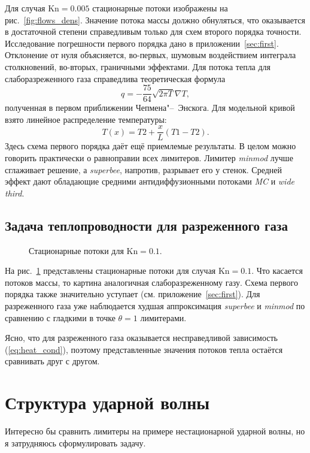 \documentclass[a4paper,10pt]{article}
\newcommand{\Kn}{\mathrm{Kn}}
\begin{document}
Для случая \(\Kn=0.005\) стационарные потоки изображены на рис.~\ref{fig:flows_dens}.
Значение потока массы должно обнуляться, что оказывается в достаточной степени справедливым только для схем второго порядка точности.
Исследование погрешности первого порядка дано в приложении~\ref{sec:first}. 
Отклонение от нуля объясняется, во-первых, шумовым воздействием интеграла столкновений, во-вторых, граничными эффектами.
Для потока тепла для слаборазреженного газа справедлива теоретическая формула
\begin{equation}
 q=-\frac{75}{64}\sqrt{2\pi T}\nabla T,
\label{eq:heat_cond}
\end{equation}
полученная в первом приближении Чепмена"--~Энскога.
Для модельной кривой взято линейное распределение температуры:
\[ T(x)=T2+\frac{x}{L}(T1-T2).\]
Здесь схема первого порядка даёт ещё приемлемые результаты.
В целом можно говорить практически о равноправии всех лимитеров.
Лимитер \textit{minmod} лучше сглаживает решение, а \textit{superbee}, напротив, разрывает его у стенок.
Средней эффект дают обладающие средними антидиффузионными потоками \textit{MC} и \textit{wide third}.

\subsection{Задача теплопроводности для разреженного газа}
\begin{figure}[h]
	\caption{Стационарные потоки для \(\Kn=0.1\).}\label{fig:flows_rare}
\end{figure}

На рис.~\ref{fig:flows_rare} представлены стационарные потоки для случая \(\Kn=0.1\).
Что касается потоков массы, то картина аналогичная слаборазреженному газу.
Схема первого порядка также значительно уступает (см. приложение~\ref{sec:first}).
Для разреженного газа уже наблюдается худшая аппроксимация \textit{superbee} и \textit{minmod}
по сравнению с гладкими в точке \(\theta=1\) лимитерами.

Ясно, что для разреженного газа оказывается несправедливой зависимость (\ref{eq:heat_cond}),
поэтому представленные значения потоков тепла остаётся сравнивать друг с другом.

\section{Структура ударной волны}
Интересно бы сравнить лимитеры на примере нестационарной ударной волны, но я затрудняюсь сформулировать задачу.
\end{document}
